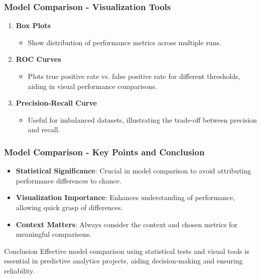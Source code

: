 \documentclass{beamer}
\begin{document}
\begin{frame}[fragile]
    \frametitle{Model Comparison - Visualization Tools}
    \begin{enumerate}
        \item \textbf{Box Plots}
        \begin{itemize}
            \item Show distribution of performance metrics across multiple runs.
        \end{itemize}

        \item \textbf{ROC Curves}
        \begin{itemize}
            \item Plots true positive rate vs. false positive rate for different thresholds, aiding in visual performance comparisons.
        \end{itemize}

        \item \textbf{Precision-Recall Curve}
        \begin{itemize}
            \item Useful for imbalanced datasets, illustrating the trade-off between precision and recall.
        \end{itemize}
    \end{enumerate}
\end{frame}

\begin{frame}[fragile]
    \frametitle{Model Comparison - Key Points and Conclusion}
    \begin{itemize}
        \item \textbf{Statistical Significance}: Crucial in model comparison to avoid attributing performance differences to chance.
        \item \textbf{Visualization Importance}: Enhances understanding of performance, allowing quick grasp of differences.
        \item \textbf{Context Matters}: Always consider the context and chosen metrics for meaningful comparisons.
    \end{itemize}
    
    \begin{block}{Conclusion}
        Effective model comparison using statistical tests and visual tools is essential in predictive analytics projects, aiding decision-making and ensuring reliability.
    \end{block}
\end{frame}
\end{document}
